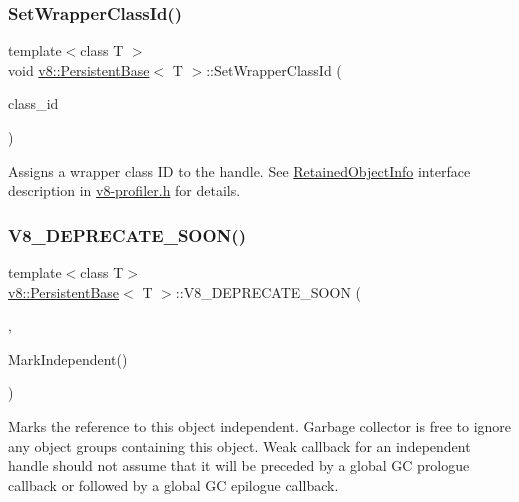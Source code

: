 \subsubsection{\texorpdfstring{Set\+Wrapper\+Class\+Id()}{SetWrapperClassId()}}
{\footnotesize\ttfamily template$<$class T $>$ \\
void \mbox{\hyperlink{classv8_1_1PersistentBase}{v8\+::\+Persistent\+Base}}$<$ T $>$\+::Set\+Wrapper\+Class\+Id (\begin{DoxyParamCaption}\item[{uint16\+\_\+t}]{class\+\_\+id }\end{DoxyParamCaption})}

Assigns a wrapper class ID to the handle. See \mbox{\hyperlink{classv8_1_1RetainedObjectInfo}{Retained\+Object\+Info}} interface description in \mbox{\hyperlink{v8-profiler_8h_source}{v8-\/profiler.\+h}} for details. \mbox{\label{classv8_1_1PersistentBase_a760df2921447e2344ec564d0268d9d1c}} 
\subsubsection{\texorpdfstring{V8\+\_\+\+D\+E\+P\+R\+E\+C\+A\+T\+E\+\_\+\+S\+O\+O\+N()}{V8\_DEPRECATE\_SOON()}}
{\footnotesize\ttfamily template$<$class T$>$ \\
\mbox{\hyperlink{classv8_1_1PersistentBase}{v8\+::\+Persistent\+Base}}$<$ T $>$\+::V8\+\_\+\+D\+E\+P\+R\+E\+C\+A\+T\+E\+\_\+\+S\+O\+ON (\begin{DoxyParamCaption}\item[{\char`\"{}Objects are always considered independent. \char`\"{} \char`\"{}Use \mbox{\hyperlink{classv8_1_1PersistentBase_a7244edd33a45b7d95e566fce85e3f87d}{Mark\+Active}} to avoid collecting otherwise dead weak handles.\char`\"{}}]{,  }\item[{V8\+\_\+\+I\+N\+L\+I\+NE void }]{Mark\+Independent() }\end{DoxyParamCaption})}

Marks the reference to this object independent. Garbage collector is free to ignore any object groups containing this object. Weak callback for an independent handle should not assume that it will be preceded by a global GC prologue callback or followed by a global GC epilogue callback. \mbox{\label{classv8_1_1PersistentBase_ac81668d70faff8ee84aa6db410b3ce3c}} 
